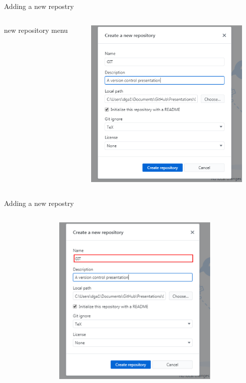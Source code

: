 \documentclass[10pt]{beamer}
\begin{document}
\begin{frame}[fragile]{Adding a new repostry}
  \begin{columns}[T]
    \begin{column}{.2\textwidth}
	\small new repository menu
    \end{column}
    \begin{column}{.8\textwidth}
	\includegraphics[width=8cm]{Figs/GHD/new_repo_00}
    \end{column}
  \end{columns}
\end{frame}


\begin{frame}[fragile]{Adding a new repostry}
  \begin{columns}[T]
    \begin{column}{.2\textwidth}
    \end{column}
    \begin{column}{.8\textwidth}
	\includegraphics[width=8cm]{Figs/GHD/new_repo_01}
    \end{column}
  \end{columns}
\end{frame}
\end{document}
